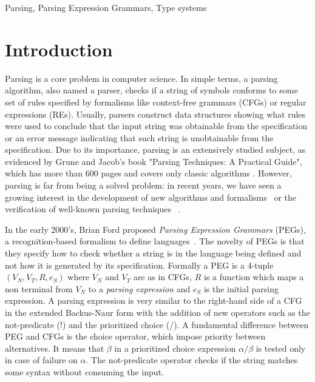 \documentclass[sigplan,screen]{acmart}
\theoremstyle{definition}
\begin{document}
Parsing, Parsing Expression Grammars, Type systems



\section{Introduction}\label{sec:intro}

Parsing is a core problem in computer science. In simple terms, a parsing
algorithm, also named a parser, checks if a string of symbols conforms to some
set of rules specified by formalisms like context-free grammars (CFGs) or
regular expressions (REs). Usually, parsers construct data structures showing
what rules were used to conclude that the input string was obtainable from the
specification or an error message indicating that such string is unobtainable
from the specification. Due to its importance, parsing is an extensively studied
subject, as evidenced by Grune and Jacob's book "Parsing Techniques: A Practical
Guide", which has more than 600 pages and covers only classic algorithms \cite{Grune90}.
However, parsing is far from being a solved problem: in recent years,
we have seen a growing interest in the development of new algorithms and
formalisms~\cite{Ford2004, Trevor10,Asperti10, Lucks17, Zhang23} or the verification
of well-known parsing techniques ~\cite{FirsovU14, FirsovU13,LopesRC16,Bernardy16}.

In the early 2000's, Brian Ford proposed \emph{Parsing Expression Grammars}
(PEGs),  a recognition-based formalism to
define languages~\cite{Ford2004}. The novelty of PEGs is that they
specify how to check whether a string is in
the language being defined and not how it is generated by its specification.
Formally a PEG is a 4-tuple $(V_N, V_T, R, e_S)$ where $V_N$ and $V_T$ are
as in CFGs, $R$ is a function which maps a non terminal
from $V_N$ to a {\it parsing expression} and $e_S$ is the initial parsing
expression. A parsing expression is very
similar to the right-hand side of a CFG in the extended Backus-Naur
form with the addition of new operators such as the not-predicate (!) and
the prioritized choice (/). A fundamental difference between PEG
and CFGs is the choice operator, which impose priority between alternatives.
It means that $\beta$ in a prioritized choice expression $\alpha / \beta$ is tested only
in case of failure on $\alpha$. The not-predicate operator checks
if the string matches some syntax without consuming the input.
\end{document}
